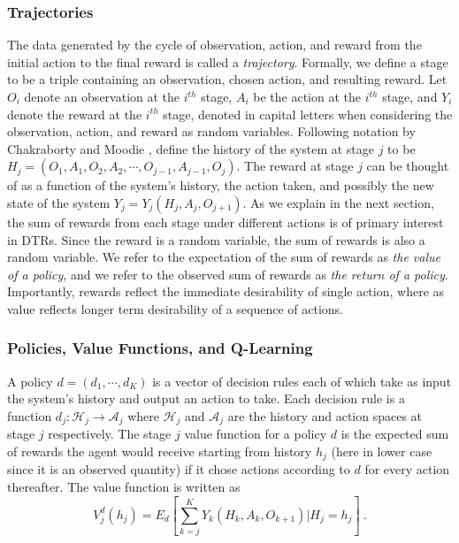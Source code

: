 \subsubsection{Trajectories}

The data generated by the cycle of observation, action, and reward from the initial action to the final reward is called a \textit{trajectory}. Formally, we define a stage to be a triple containing an observation, chosen action, and resulting reward. Let $O_i$ denote an observation at the $i^{th}$ stage, $ A_i $ be the action at the $ i^{th} $ stage, and $ Y_i $ denote the reward at the $ i^{th}$ stage, denoted in capital letters when considering the observation, action, and reward as random variables. Following notation by Chakraborty and Moodie \cite{chakraborty2013statistical},  define the history of the system at stage $j$ to be $ H_j = (O_1, A_1, O_2, A_2, \cdots , O_{j-1}, A_{j-1}, O_j) $.  The reward at stage $j$ can be thought of as a function of the system’s history, the action taken, and possibly the new state of the system $ Y_j = Y_j(H_j, A_j, O_{j+1}) $.  As we explain in the next section, the sum of rewards from each stage under different actions is of primary interest in DTRs.  Since the reward is a random variable, the sum of rewards is also a random variable.  We refer to the expectation of the sum of rewards as \textit{the value of a policy}, and we refer to the observed sum of rewards as \textit{the return of a policy}. Importantly, rewards reflect the immediate desirability of single action, where as value reflects longer term desirability of a sequence of actions.

\subsubsection{Policies, Value Functions, and Q-Learning}

A policy $ d = (d_1, \cdots, d_K) $ is a vector of decision rules each of which take as input the system’s history and output an action to take.  Each decision rule is a function $d_j : \mathcal{H}_j \to \mathcal{A}_j$ where $\mathcal{H}_j$ and $\mathcal{A}_j$ are the history and action spaces at stage $j$ respectively.  The stage $ j $ value function for a policy $ d $ is the expected sum of rewards the agent would receive starting from history $ h_j  $ (here in lower case since it is an observed quantity) if it chose actions according to $ d $ for every action thereafter.  The value function is written as
\begin{equation}
	V^d_j(h_j) = E_d\left[ \sum_{k=j}^K Y_k(H_k, A_k, O_{k+1}) \Bigg\lvert H_j = h_j\right] \>.
\end{equation}

